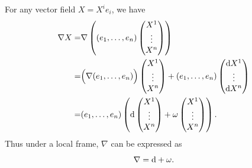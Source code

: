 For any vector field $X = X^i e_i$, we have 
\begin{align*}
    \nabla X =& \nabla\left(({e}_{1},\dots,{e}_{n})
    \begin{pmatrix}
        X^1 \\ \vdots \\ X^n
    \end{pmatrix}
    \right) \\ 
    =& \Big(\nabla({e}_{1},\dots,{e}_{n})\Big)
    \begin{pmatrix}
        X^1 \\ \vdots \\ X^n
    \end{pmatrix} + ({e}_{1},\dots,{e}_{n}) 
    \begin{pmatrix}
        {\rm d} X^1 \\ \vdots \\ {\rm d} X^n
    \end{pmatrix} \\
    =& ({e}_{1},\dots,{e}_{n}) 
    \left( {\rm d} 
    \begin{pmatrix}
        X^1 \\ \vdots \\ X^n 
    \end{pmatrix} + 
    \omega 
    \begin{pmatrix}
        X^1 \\ \vdots \\ X^n
    \end{pmatrix}
    \right).
\end{align*}
Thus under a local frame, $\nabla$ can be expressed as 
\begin{equation*}
    \nabla = {\rm d} + \omega.
\end{equation*}

